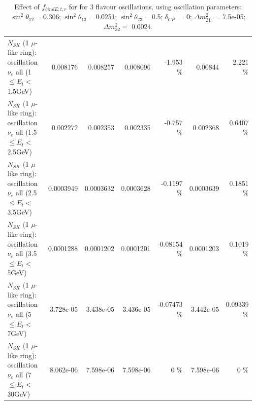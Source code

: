 \begin{table}
\begin{tabular}{| l | r | r | r  r | r  r |}
$N_{SK}$ (1 $\mu$-like ring): oscillation $\nu_{e}$ all (1 $\leq E_{t} <$ 1.5GeV) &        0.008176 &        0.008257 &        0.008096 &   -1.953 \%  &         0.00844 &    2.221 \%  \\ 
$N_{SK}$ (1 $\mu$-like ring): oscillation $\nu_{e}$ all (1.5 $\leq E_{t} <$ 2.5GeV) &        0.002272 &        0.002353 &        0.002335 &   -0.757 \%  &        0.002368 &   0.6407 \%  \\ 
$N_{SK}$ (1 $\mu$-like ring): oscillation $\nu_{e}$ all (2.5 $\leq E_{t} <$ 3.5GeV) &       0.0003949 &       0.0003632 &       0.0003628 &  -0.1197 \%  &       0.0003639 &   0.1851 \%  \\ 
$N_{SK}$ (1 $\mu$-like ring): oscillation $\nu_{e}$ all (3.5 $\leq E_{t} <$ 5GeV) &       0.0001288 &       0.0001202 &       0.0001201 & -0.08154 \%  &       0.0001203 &   0.1019 \%  \\ 
 $N_{SK}$ (1 $\mu$-like ring): oscillation $\nu_{e}$ all (5 $\leq E_{t} <$ 7GeV) &       3.728e-05 &       3.438e-05 &       3.436e-05 & -0.07473 \%  &       3.442e-05 &  0.09339 \%  \\ 
$N_{SK}$ (1 $\mu$-like ring): oscillation $\nu_{e}$ all (7 $\leq E_{t} <$ 30GeV) &       8.062e-06 &       7.598e-06 &       7.598e-06 &        0 \%  &       7.598e-06 &        0 \%  \\ 
\hline
\hline
\end{tabular}
\caption{ Effect of $f_{bindE; t, r}$ for for 3 flavour oscillations, using oscillation parameters:  $\sin^2\theta_{12} = $0.306; $\sin^2\theta_{13} = $0.0251; $\sin^2\theta_{23} = $0.5; $\delta_{CP} = $        0; $\Delta m^2_{21} = $    7.5e-05; $\Delta m^2_{32} = $    0.0024. }
\label{tab:num_xsec_bindE_1RmuT_3f_osc_t13:0.0251}
\end{table}
\clearpage

